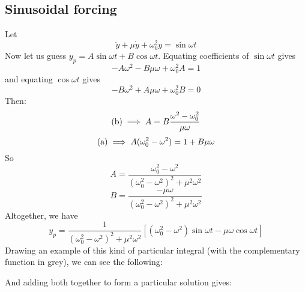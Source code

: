 \subsection{Sinusoidal forcing}
Let
\[
	\ddot y + \mu \dot y + \omega_0^2 y = \sin \omega t
\]
Now let us guess \(y_p = A\sin \omega t + B\cos \omega t\).
Equating coefficients of \(\sin\omega t\) gives
\[
	-A\omega^2 - B\mu\omega + \omega_0^2A = 1 \tag{a}
\]
and equating \(\cos\omega t\) gives
\[
	-B\omega^2 + A\mu\omega + \omega_0^2B = 0 \tag{b}
\]
Then:
\[
	(\text b) \implies A = B \frac{\omega^2 - \omega_0^2}{\mu\omega}
\]
\[
	(\text a) \implies A(\omega_0^2 - \omega^2) = 1 + B\mu\omega
\]
So
\[
	A = \frac{\omega_0^2 - \omega^2}{(\omega_0^2 - \omega^2)^2 + \mu^2\omega^2}
\]
\[
	B = \frac{-\mu\omega}{(\omega_0^2 - \omega^2)^2 + \mu^2\omega^2}
\]
Altogether, we have
\[
	y_p = \frac{1}{(\omega_0^2 - \omega^2)^2 + \mu^2\omega^2}\left[ (\omega_0^2 - \omega^2)\sin\omega t - \mu \omega \cos \omega t \right]
\]
Drawing an example of this kind of particular integral (with the complementary function in grey), we can see the following:


And adding both together to form a particular solution gives:


